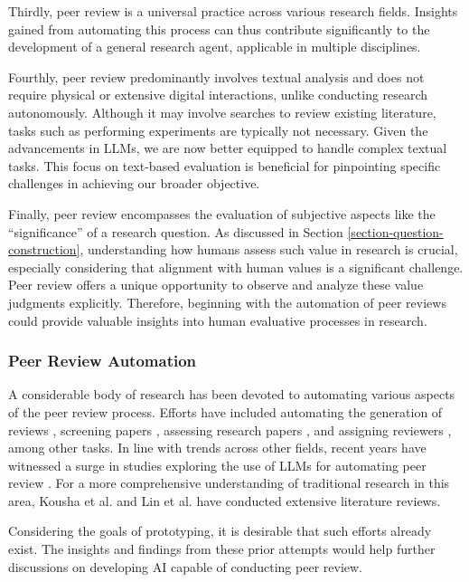 \documentclass{article}
\begin{document}
Thirdly, peer review is a universal practice across various research fields. Insights gained from automating this process can thus contribute significantly to the development of a general research agent, applicable in multiple disciplines.

Fourthly, peer review predominantly involves textual analysis and does not require physical or extensive digital interactions, unlike conducting research autonomously. Although it may involve searches to review existing literature, tasks such as performing experiments are typically not necessary. Given the advancements in LLMs, we are now better equipped to handle complex textual tasks. This focus on text-based evaluation is beneficial for pinpointing specific challenges in achieving our broader objective.

Finally, peer review encompasses the evaluation of subjective aspects like the ``significance'' of a research question. As discussed in Section \ref{section-question-construction}, understanding how humans assess such value in research is crucial, especially considering that alignment with human values is a significant challenge. Peer review offers a unique opportunity to observe and analyze these value judgments explicitly. Therefore, beginning with the automation of peer reviews could provide valuable insights into human evaluative processes in research.

\subsubsection{Peer Review Automation}

A considerable body of research has been devoted to automating various aspects of the peer review process. Efforts have included automating the generation of reviews \cite{yuan2022can,yuan2022kid,wang2020reviewrobot}, screening papers \cite{schulz2022future}, assessing research papers \cite{kousha2022artificial}, and assigning reviewers \cite{zhao2022reviewer}, among other tasks. In line with trends across other fields, recent years have witnessed a surge in studies exploring the use of LLMs for automating peer review \cite{wexin2023can,liu2023reviewergpt,robertson2023gpt4,hosseini2023fighting}. For a more comprehensive understanding of traditional research in this area, Kousha et al. \cite{kousha2022artificial} and Lin et al. \cite{lin2021automated} have conducted extensive literature reviews.

Considering the goals of prototyping, it is desirable that such efforts already exist. The insights and findings from these prior attempts would help further discussions on developing AI capable of conducting peer review. 
\end{document}
